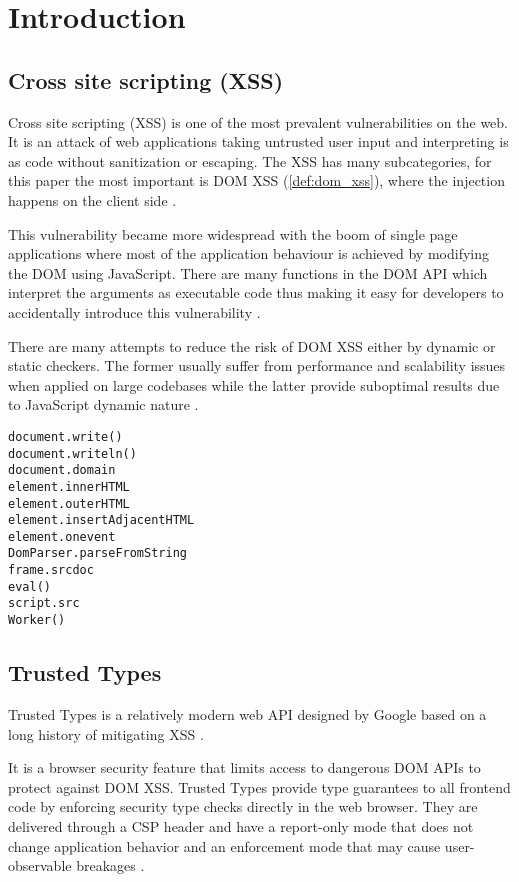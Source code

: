 \chapter{Introduction}

\section{Cross site scripting (XSS)}

Cross site scripting (XSS) is one of the most prevalent vulnerabilities on the web. It is an attack
of web applications taking untrusted user input and interpreting is as code without sanitization or
escaping. The XSS has many subcategories, for this paper the most important is DOM XSS
(\ref{def:dom_xss}), where the injection happens on the client side \cite{tt_web_framework_paper}.

This vulnerability became more widespread with the boom of single page applications where most of
the application behaviour is achieved by modifying the DOM using JavaScript. There are many
functions in the DOM API which interpret the arguments as executable code thus making it easy for
developers to accidentally introduce this vulnerability \cite{tt_web_framework_paper}.

There are many attempts to reduce the risk of DOM XSS either by dynamic or static checkers. The
former usually suffer from performance and scalability issues when applied on large codebases while
the latter provide suboptimal results due to JavaScript dynamic nature
\cite{tt_web_framework_paper}.

\bigskip
\begin{lstlisting}[language={}, caption=Examples of DOM XSS attack vectors \cite{dom_xss_portswigger} \cite{tt_web_framework_paper}]
document.write()
document.writeln()
document.domain
element.innerHTML
element.outerHTML
element.insertAdjacentHTML
element.onevent
DomParser.parseFromString
frame.srcdoc
eval()
script.src
Worker()
\end{lstlisting}

\section{Trusted Types}

Trusted Types is a relatively modern web API designed by Google based on a long history of
mitigating XSS \cite{tt_design_history}.

It is a browser security feature that limits access to dangerous DOM APIs to protect against DOM
XSS. Trusted Types provide type guarantees to all frontend code by enforcing security type checks
directly in the web browser. They are delivered through a CSP header and have a report-only mode
that does not change application behavior and an enforcement mode that may cause user-observable
breakages \cite{tt_background}.

